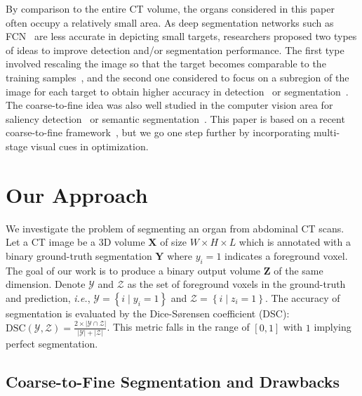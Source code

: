 \documentclass[10pt,twocolumn,letterpaper]{article}
\begin{document}
By comparison to the entire CT volume, the organs considered in this paper often occupy a relatively small area.
As deep segmentation networks such as FCN~\cite{Long_2015_Fully} are less accurate in depicting small targets,
researchers proposed two types of ideas to improve detection and/or segmentation performance.
The first type involved rescaling the image so that the target becomes comparable to the training samples~\cite{Xia_2016_Zoom},
and the second one considered to focus on a subregion of the image for each target
to obtain higher accuracy in detection~\cite{Chen_2016_Mitosis} or segmentation~\cite{Zhou_2017_Fixed}.
The coarse-to-fine idea was also well studied in the computer vision area
for saliency detection~\cite{Kuen_2016_Recurrent} or semantic segmentation~\cite{Li_2017_Instance}\cite{Lin_2017_RefineNet}.
This paper is based on a recent coarse-to-fine framework~\cite{Zhou_2017_Fixed},
but we go one step further by incorporating multi-stage visual cues in optimization.


\vspace{-0.02cm}
\section{Our Approach}
\label{Approach}

We investigate the problem of segmenting an organ from abdominal CT scans.
Let a CT image be a 3D volume $\mathbf{X}$ of size $W\times H\times L$
which is annotated with a binary ground-truth segmentation $\mathbf{Y}$ where ${y_i}={1}$ indicates a foreground voxel.
The goal of our work is to produce a binary output volume $\mathbf{Z}$ of the same dimension.
Denote $\mathcal{Y}$ and $\mathcal{Z}$ as the set of foreground voxels in the ground-truth and prediction,
{\em i.e.}, ${\mathcal{Y}}={\left\{i\mid y_i=1\right\}}$ and ${\mathcal{Z}}={\left\{i\mid z_i=1\right\}}$.
The accuracy of segmentation is evaluated by the Dice-S{\o}rensen coefficient (DSC):
${\mathrm{DSC}\!\left(\mathcal{Y},\mathcal{Z}\right)}=
    {\frac{2\times\left|\mathcal{Y}\cap\mathcal{Z}\right|}{\left|\mathcal{Y}\right|+\left|\mathcal{Z}\right|}}$.
This metric falls in the range of $\left[0,1\right]$ with $1$ implying perfect segmentation.


\subsection{Coarse-to-Fine Segmentation and Drawbacks}
\label{Approach:Baseline}
\end{document}
